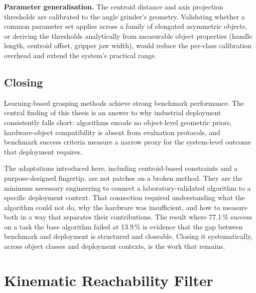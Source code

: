\documentclass[12pt, a4paper]{report}
\begin{document}
\textbf{Parameter generalisation.} The centroid distance and axis projection thresholds are calibrated to the angle grinder's geometry. Validating whether a common parameter set applies across a family of elongated asymmetric objects, or deriving the thresholds analytically from measurable object properties (handle length, centroid offset, gripper jaw width), would reduce the per-class calibration overhead and extend the system's practical range.

\section{Closing}
\label{sec:closing}

Learning-based grasping methods achieve strong benchmark performance. The central finding of this thesis is an answer to why industrial deployment consistently falls short: algorithms encode no object-level geometric priors, hardware-object compatibility is absent from evaluation protocols, and benchmark success criteria measure a narrow proxy for the system-level outcome that deployment requires.

The adaptations introduced here, including centroid-based constraints and a purpose-designed fingertip, are not patches on a broken method. They are the minimum necessary engineering to connect a laboratory-validated algorithm to a specific deployment context. That connection required understanding what the algorithm could not do, why the hardware was insufficient, and how to measure both in a way that separates their contributions. The result where 77.1\,\% success on a task the base algorithm failed at 13.9\,\% is evidence that the gap between benchmark and deployment is structured and closeable. Closing it systematically, across object classes and deployment contexts, is the work that remains.





\appendix

\chapter{Kinematic Reachability Filter}
\label{chap:appendix-reachability}
\end{document}
